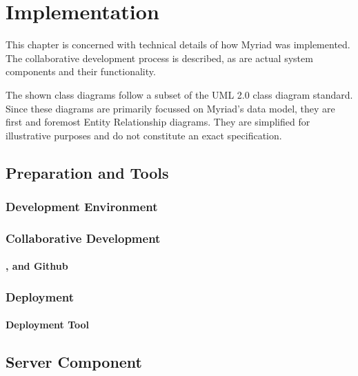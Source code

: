 \chapter{Implementation}
\label{chapter:Implementation}

This chapter is concerned with technical details of how Myriad was implemented. The collaborative development process is described, as are actual system components and their functionality.

The shown class diagrams follow a subset of the UML 2.0 class diagram standard\cite{uml}. Since these diagrams are primarily focussed on Myriad's data model, they are first and foremost Entity Relationship diagrams. They are simplified for illustrative purposes and do not constitute an exact specification.

\section{Preparation and Tools}



\subsection{Development Environment}



\subsection{Collaborative Development}



\subsubsection{,  and Github}



\subsection{Deployment}



\subsubsection{Deployment Tool }




\section{Server Component}


